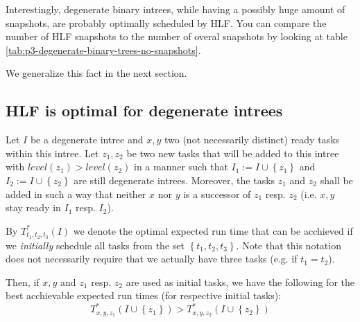 Interestingly, degenerate binary intrees, while having a possibly huge amount of snapshots, are probably optimally scheduled by HLF. You can compare the number of HLF snapshots to the number of overal snapshots by looking at table \ref{tab:p3-degenerate-binary-trees-no-snapshots}.

We generalize this fact in the next section.

\subsection{HLF is optimal for degenerate intrees}
\label{sec:p3-degenerate-intrees-hlf-optimal}

\begin{lemma}
  \label{lem:p3-adding-tasks-level-keep-scheduled-same-inequality}
  Let $I$ be a degenerate intree and $x, y$ two (not necessarily distinct) ready tasks within this intree. Let $z_1, z_2$ be two new tasks that will be added to this intree with $level(z_1) > level(z_2)$ in a manner such that $I_1:=I\cup\left\{ z_1 \right\}$ and $I_2:=I\cup\left\{ z_2 \right\}$ are still degenerate intrees. Moreover, the tasks $z_1$ and $z_2$ shall be added in such a way that neither $x$ nor $y$ is a successor of $z_1$ resp. $z_2$ (i.e. $x,y$ stay ready in $I_1$ resp. $I_2$). 
  
  By $T^*_{t_1,t_2,t_3}(I)$ we denote the optimal expected run time that can be acchieved if we \emph{initially} schedule all tasks from the set $\left\{ t_1,t_2,t_3 \right\}$.  Note that this notation does not necessarily require that we actually have three tasks (e.g. if $t_1=t_2$).
  
  Then, if $x,y$ and $z_1$ resp. $z_2$ are used as initial tasks, we have the following for the best acchievable expected run times (for respective initial tasks):
  \begin{equation}
    \label{eq:lemma-p3-adding-tasks-level-keep-scheduled-same-inequality}
    T^{*}_{x,y,z_1}\left(I\cup\left\{ z_1 \right\}\right) > T^{*}_{x,y,z_2}\left( I\cup\left\{ z_2 \right\} \right)
  \end{equation}
\end{lemma}

